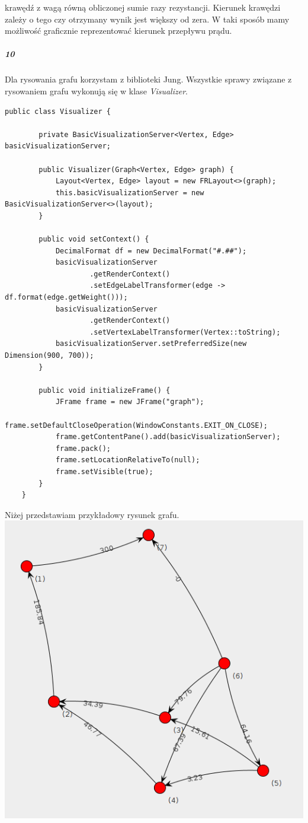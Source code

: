 \documentclass[12pt,a4paper]{article}
\begin{document}
krawędź z wagą równą obliczonej sumie razy rezystancji. Kierunek krawędzi
zależy o tego czy otrzymany wynik jest większy od zera. W taki sposób mamy
możliwość graficznie reprezentować kierunek przepływu prądu.
\subparagraph{10} Dla rysowania grafu korzystam z biblioteki Jung. Wszystkie
sprawy związane z rysowaniem grafu wykonują się w klase \emph{Visualizer}.
\begin{Verbatim}[fontsize=\small]
    public class Visualizer {

        private BasicVisualizationServer<Vertex, Edge> basicVisualizationServer;

        public Visualizer(Graph<Vertex, Edge> graph) {
            Layout<Vertex, Edge> layout = new FRLayout<>(graph);
            this.basicVisualizationServer = new BasicVisualizationServer<>(layout);
        }

        public void setContext() {
            DecimalFormat df = new DecimalFormat("#.##");
            basicVisualizationServer
                    .getRenderContext()
                    .setEdgeLabelTransformer(edge -> df.format(edge.getWeight()));
            basicVisualizationServer
                    .getRenderContext()
                    .setVertexLabelTransformer(Vertex::toString);
            basicVisualizationServer.setPreferredSize(new Dimension(900, 700));
        }

        public void initializeFrame() {
            JFrame frame = new JFrame("graph");
            frame.setDefaultCloseOperation(WindowConstants.EXIT_ON_CLOSE);
            frame.getContentPane().add(basicVisualizationServer);
            frame.pack();
            frame.setLocationRelativeTo(null);
            frame.setVisible(true);
        }
    }
\end{Verbatim}
Niżej przedstawiam przykładowy rysunek grafu.
\includegraphics[width=1\textwidth]{img/graph} \\
\end{document}
